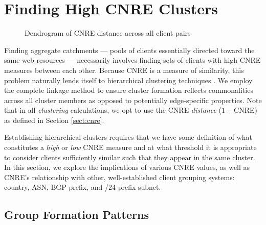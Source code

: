 \section{Finding High CNRE Clusters} \label{sect:finding}

\begin{figure*}
    \caption{Dendrogram of CNRE distance across all client pairs}
    \label{fig:dendrogram}
\end{figure*}

Finding aggregate catchments --- pools of clients essentially directed toward
the same web resources --- necessarily involves finding sets of clients with high
CNRE measures between each other. Because CNRE is a measure of similarity, this
problem naturally lends itself to hierarchical clustering techniques \cite{murtagh1983survey}. 
We employ the complete linkage method to ensure cluster formation reflects commonalities
across all cluster members as opposed to potentially edge-specific properties.
Note that in all \emph{clustering} calculations, we opt to use the CNRE \emph{distance}
(\(1-\)CNRE) as defined in Section \ref{sect:cnre}.

Establishing hierarchical clusters requires that we have some definition of what
constitutes a \emph{high} or \emph{low} CNRE measure and at what threshold it is
appropriate to consider clients sufficiently similar such that they appear in
the same cluster. In this section, we explore the implications of various CNRE
values, as well as CNRE's relationship with other, well-established client grouping
systems: country, ASN, BGP prefix, and /24 prefix subnet.

\subsection{Group Formation Patterns}
\label{s:formation}

